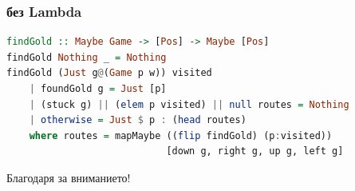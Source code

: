 \documentclass{beamer}
\begin{document}
\begin{frame}[fragile]
  \frametitle{без Lambda}

\begin{lstlisting}[basicstyle=\tiny,language=Haskell]
findGold :: Maybe Game -> [Pos] -> Maybe [Pos]
findGold Nothing _ = Nothing
findGold (Just g@(Game p w)) visited
    | foundGold g = Just [p]
    | (stuck g) || (elem p visited) || null routes = Nothing
    | otherwise = Just $ p : (head routes)
    where routes = mapMaybe ((flip findGold) (p:visited))
                            [down g, right g, up g, left g]  
\end{lstlisting}
  
\end{frame}


\begin{frame}
  \centerline{Благодаря за вниманието!}
\end{frame}
\end{document}
